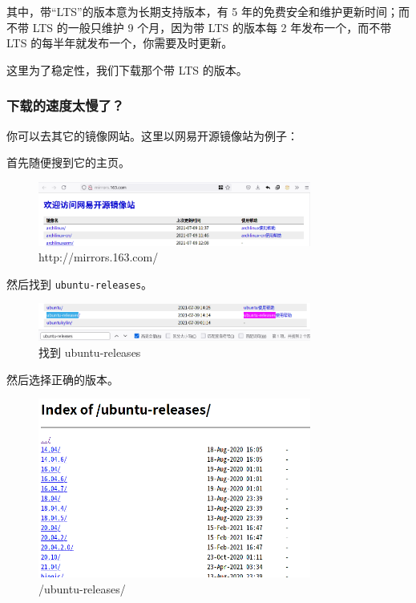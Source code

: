 \documentclass[UTF-8]{ctexart}
\begin{document}
				其中，带“LTS”的版本意为长期支持版本，有 5 年的免费安全和维护更新时间；而不带 LTS 的一般只维护 9 个月，因为带 LTS 的版本每 2 年发布一个，而不带 LTS 的每半年就发布一个，你需要及时更新。
				
				这里为了稳定性，我们下载那个带 LTS 的版本。
			
			\subsubsection{下载的速度太慢了？}
			
				你可以去其它的镜像网站。这里以网易开源镜像站为例子：
				
				首先随便搜到它的主页。
				
				\begin{figure}[H]
					\centering
					\includegraphics[width=0.8\textwidth]{fig/mirrors163com.png}
					\caption*{http://mirrors.163.com/}
				\end{figure}
			
				然后找到 \texttt{ubuntu-releases}。
				
				\begin{figure}[H]
					\centering
					\includegraphics[width=0.8\textwidth]{fig/mirrors163com_find.png}
					\caption*{找到 ubuntu-releases}
				\end{figure}
				
				然后选择正确的版本。
				
				\begin{figure}[H]
					\centering
					\includegraphics[width=0.8\textwidth]{fig/mirrors163com_in_ubuntu-releases.png}
					\caption*{/ubuntu-releases/}
				\end{figure}
			
\end{document}
